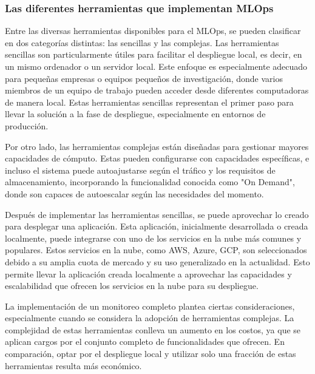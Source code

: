 \subsubsection{Las diferentes herramientas que implementan MLOps}

Entre las diversas herramientas disponibles para el MLOps, se pueden clasificar en dos categorías distintas: las sencillas y las complejas. Las herramientas sencillas son particularmente útiles para facilitar el despliegue local, es decir, en un mismo ordenador o un servidor local. Este enfoque es especialmente adecuado para pequeñas empresas o equipos pequeños de investigación, donde varios miembros de un equipo de trabajo pueden acceder desde diferentes computadoras de manera local. Estas herramientas sencillas representan el primer paso para llevar la solución a la fase de despliegue, especialmente en entornos de producción. \newline

Por otro lado, las herramientas complejas están diseñadas para gestionar mayores capacidades de cómputo. Estas pueden configurarse con capacidades específicas, e incluso el sistema puede autoajustarse según el tráfico y los requisitos de almacenamiento, incorporando la funcionalidad conocida como "On Demand", donde son capaces de autoescalar según las necesidades del momento. \newline

\newpage

Después de implementar las herramientas sencillas, se puede aprovechar lo creado para desplegar una aplicación. Esta aplicación, inicialmente desarrollada o creada localmente, puede integrarse con uno de los servicios en la nube más comunes y populares. Estos servicios en la nube, como AWS, Azure, GCP, son seleccionados debido a su amplia cuota de mercado y su uso generalizado en la actualidad. Esto permite llevar la aplicación creada localmente a aprovechar las capacidades y escalabilidad que ofrecen los servicios en la nube para su despliegue. \newline

La implementación de un monitoreo completo plantea ciertas consideraciones, especialmente cuando se considera la adopción de herramientas complejas. La complejidad de estas herramientas conlleva un aumento en los costos, ya que se aplican cargos por el conjunto completo de funcionalidades que ofrecen. En comparación, optar por el despliegue local y utilizar solo una fracción de estas herramientas resulta más económico. \newline


